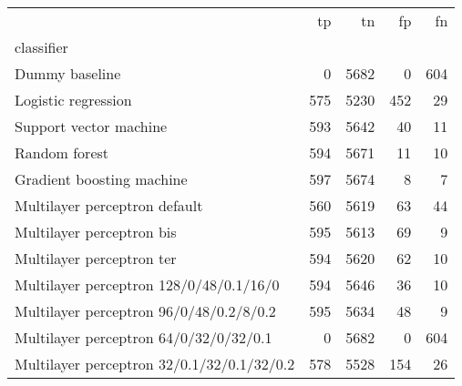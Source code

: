 \begin{tabular}{lrrrr}
\toprule
 & tp & tn & fp & fn \\
classifier &  &  &  &  \\
\midrule
Dummy baseline & 0 & 5682 & 0 & 604 \\
Logistic regression & 575 & 5230 & 452 & 29 \\
Support vector machine & 593 & 5642 & 40 & 11 \\
Random forest & 594 & 5671 & 11 & 10 \\
Gradient boosting machine & 597 & 5674 & 8 & 7 \\
Multilayer perceptron default & 560 & 5619 & 63 & 44 \\
Multilayer perceptron bis & 595 & 5613 & 69 & 9 \\
Multilayer perceptron ter & 594 & 5620 & 62 & 10 \\
Multilayer perceptron 128/0/48/0.1/16/0 & 594 & 5646 & 36 & 10 \\
Multilayer perceptron 96/0/48/0.2/8/0.2 & 595 & 5634 & 48 & 9 \\
Multilayer perceptron 64/0/32/0/32/0.1 & 0 & 5682 & 0 & 604 \\
Multilayer perceptron 32/0.1/32/0.1/32/0.2 & 578 & 5528 & 154 & 26 \\
\bottomrule
\end{tabular}
